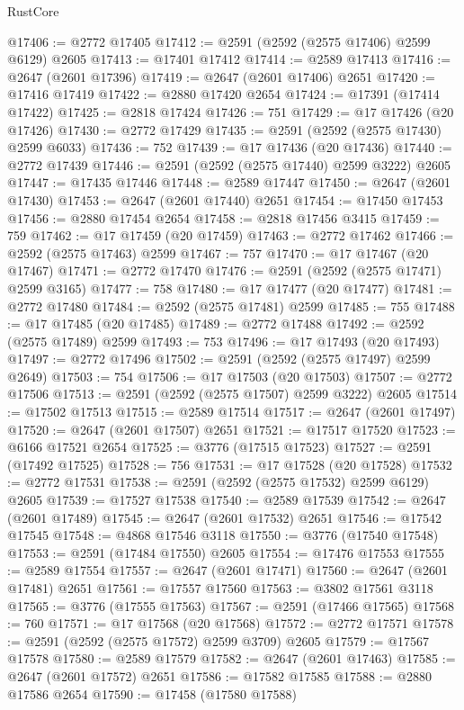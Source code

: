 \begin{lexlean}{RustCore}
\begin{coremodule}
@17406 := @2772 @17405
@17412 := @2591 (@2592 (@2575 @17406) @2599 @6129) @2605
@17413 := @17401 @17412
@17414 := @2589 @17413
@17416 := @2647 (@2601 @17396)
@17419 := @2647 (@2601 @17406) @2651
@17420 := @17416 @17419
@17422 := @2880 @17420 @2654
@17424 := @17391 (@17414 @17422)
@17425 := @2818 @17424
@17426 := 751
@17429 := @17 @17426 (@20 @17426)
@17430 := @2772 @17429
@17435 := @2591 (@2592 (@2575 @17430) @2599 @6033)
@17436 := 752
@17439 := @17 @17436 (@20 @17436)
@17440 := @2772 @17439
@17446 := @2591 (@2592 (@2575 @17440) @2599 @3222) @2605
@17447 := @17435 @17446
@17448 := @2589 @17447
@17450 := @2647 (@2601 @17430)
@17453 := @2647 (@2601 @17440) @2651
@17454 := @17450 @17453
@17456 := @2880 @17454 @2654
@17458 := @2818 @17456 @3415
@17459 := 759
@17462 := @17 @17459 (@20 @17459)
@17463 := @2772 @17462
@17466 := @2592 (@2575 @17463) @2599
@17467 := 757
@17470 := @17 @17467 (@20 @17467)
@17471 := @2772 @17470
@17476 := @2591 (@2592 (@2575 @17471) @2599 @3165)
@17477 := 758
@17480 := @17 @17477 (@20 @17477)
@17481 := @2772 @17480
@17484 := @2592 (@2575 @17481) @2599
@17485 := 755
@17488 := @17 @17485 (@20 @17485)
@17489 := @2772 @17488
@17492 := @2592 (@2575 @17489) @2599
@17493 := 753
@17496 := @17 @17493 (@20 @17493)
@17497 := @2772 @17496
@17502 := @2591 (@2592 (@2575 @17497) @2599 @2649)
@17503 := 754
@17506 := @17 @17503 (@20 @17503)
@17507 := @2772 @17506
@17513 := @2591 (@2592 (@2575 @17507) @2599 @3222) @2605
@17514 := @17502 @17513
@17515 := @2589 @17514
@17517 := @2647 (@2601 @17497)
@17520 := @2647 (@2601 @17507) @2651
@17521 := @17517 @17520
@17523 := @6166 @17521 @2654
@17525 := @3776 (@17515 @17523)
@17527 := @2591 (@17492 @17525)
@17528 := 756
@17531 := @17 @17528 (@20 @17528)
@17532 := @2772 @17531
@17538 := @2591 (@2592 (@2575 @17532) @2599 @6129) @2605
@17539 := @17527 @17538
@17540 := @2589 @17539
@17542 := @2647 (@2601 @17489)
@17545 := @2647 (@2601 @17532) @2651
@17546 := @17542 @17545
@17548 := @4868 @17546 @3118
@17550 := @3776 (@17540 @17548)
@17553 := @2591 (@17484 @17550) @2605
@17554 := @17476 @17553
@17555 := @2589 @17554
@17557 := @2647 (@2601 @17471)
@17560 := @2647 (@2601 @17481) @2651
@17561 := @17557 @17560
@17563 := @3802 @17561 @3118
@17565 := @3776 (@17555 @17563)
@17567 := @2591 (@17466 @17565)
@17568 := 760
@17571 := @17 @17568 (@20 @17568)
@17572 := @2772 @17571
@17578 := @2591 (@2592 (@2575 @17572) @2599 @3709) @2605
@17579 := @17567 @17578
@17580 := @2589 @17579
@17582 := @2647 (@2601 @17463)
@17585 := @2647 (@2601 @17572) @2651
@17586 := @17582 @17585
@17588 := @2880 @17586 @2654
@17590 := @17458 (@17580 @17588)

\end{coremodule}
\end{lexlean}
